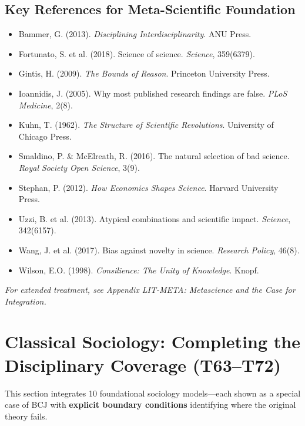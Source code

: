 \subsection{Key References for Meta-Scientific Foundation}

\begin{itemize}[nosep]
\item Bammer, G. (2013). \textit{Disciplining Interdisciplinarity}. ANU Press.
\item Fortunato, S. et al. (2018). Science of science. \textit{Science}, 359(6379).
\item Gintis, H. (2009). \textit{The Bounds of Reason}. Princeton University Press.
\item Ioannidis, J. (2005). Why most published research findings are false. \textit{PLoS Medicine}, 2(8).
\item Kuhn, T. (1962). \textit{The Structure of Scientific Revolutions}. University of Chicago Press.
\item Smaldino, P. \& McElreath, R. (2016). The natural selection of bad science. \textit{Royal Society Open Science}, 3(9).
\item Stephan, P. (2012). \textit{How Economics Shapes Science}. Harvard University Press.
\item Uzzi, B. et al. (2013). Atypical combinations and scientific impact. \textit{Science}, 342(6157).
\item Wang, J. et al. (2017). Bias against novelty in science. \textit{Research Policy}, 46(8).
\item Wilson, E.O. (1998). \textit{Consilience: The Unity of Knowledge}. Knopf.
\end{itemize}

\textit{For extended treatment, see Appendix LIT-META: Metascience and the Case for Integration.}



\section{Classical Sociology: Completing the Disciplinary Coverage (T63--T72)}
\label{sec:bcj-sociology}

This section integrates 10 foundational sociology models---each shown as a special case of BCJ with \textbf{explicit boundary conditions} identifying where the original theory fails.

